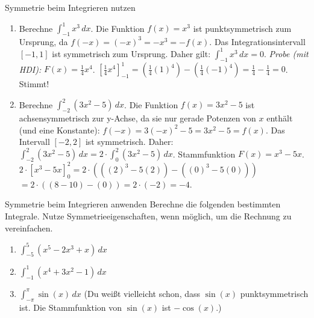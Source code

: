 \begin{beispielumgebung}{Symmetrie beim Integrieren nutzen}
\begin{enumerate}
    \item Berechne $\int_{-1}^{1} x^3 \,dx$.
        Die Funktion $f(x)=x^3$ ist punktsymmetrisch zum Ursprung, da $f(-x)=(-x)^3 = -x^3 = -f(x)$.
        Das Integrationsintervall $[-1,1]$ ist symmetrisch zum Ursprung.
        Daher gilt: $\int_{-1}^{1} x^3 \,dx = 0$.
        \textit{Probe (mit HDI):} $F(x) = \frac{1}{4}x^4$.
        $[ \frac{1}{4}x^4 ]_{-1}^{1} = (\frac{1}{4}(1)^4) - (\frac{1}{4}(-1)^4) = \frac{1}{4} - \frac{1}{4} = 0$. Stimmt!

    \item Berechne $\int_{-2}^{2} (3x^2 - 5) \,dx$.
        Die Funktion $f(x)=3x^2-5$ ist achsensymmetrisch zur y-Achse, da sie nur gerade Potenzen von $x$ enthält (und eine Konstante): $f(-x) = 3(-x)^2-5 = 3x^2-5 = f(x)$.
        Das Intervall $[-2,2]$ ist symmetrisch.
        Daher: $\int_{-2}^{2} (3x^2 - 5) \,dx = 2 \cdot \int_{0}^{2} (3x^2 - 5) \,dx$.
        Stammfunktion $F(x) = x^3 - 5x$.
        $2 \cdot [x^3 - 5x]_{0}^{2} = 2 \cdot ( ( (2)^3 - 5(2) ) - ( (0)^3 - 5(0) ) )$
        $= 2 \cdot ( (8 - 10) - (0) ) = 2 \cdot (-2) = -4$.
\end{enumerate}
\end{beispielumgebung}

\begin{aufgabenumgebung}{Symmetrie beim Integrieren anwenden}
Berechne die folgenden bestimmten Integrale. Nutze Symmetrieeigenschaften, wenn möglich, um die Rechnung zu vereinfachen.
\begin{enumerate}
    \item $\int_{-5}^{5} (x^5 - 2x^3 + x) \,dx$
    \item $\int_{-1}^{1} (x^4 + 3x^2 - 1) \,dx$
    \item $\int_{-\pi}^{\pi} \sin(x) \,dx$ (Du weißt vielleicht schon, dass $\sin(x)$ punktsymmetrisch ist. Die Stammfunktion von $\sin(x)$ ist $-\cos(x)$.)
\end{enumerate}
\end{aufgabenumgebung}



